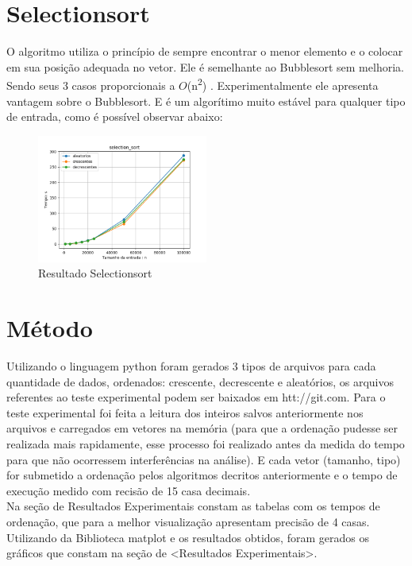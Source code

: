 \documentclass[10pt,a4paper]{article}
\begin{document}
\section{Selectionsort}
    \indent O algoritmo utiliza o princípio de sempre encontrar o menor elemento e o colocar em sua posição adequada no vetor. Ele é semelhante ao Bubblesort sem melhoria. Sendo seus 3 casos proporcionais a $O$(n\textsuperscript{2}) \cite{sunita}. Experimentalmente ele apresenta vantagem sobre o Bubblesort. E é um algorítimo muito estável para qualquer tipo de entrada, como é possível observar abaixo:
    \begin{figure}[H]
    	\centering
    	\includegraphics[width=0.5\textwidth]{Resultados/Graficos/selection_sort.png}
    	\caption{Resultado Selectionsort}
    \end{figure}

\newpage
\section{Método}
    \indent Utilizando o linguagem python foram gerados 3 tipos de arquivos para cada quantidade de dados, ordenados: crescente, decrescente e aleatórios, os arquivos referentes ao teste experimental podem ser baixados em htt://git.com. Para o teste experimental foi feita a leitura dos inteiros salvos anteriormente nos arquivos e carregados em vetores na memória (para que a ordenação pudesse ser realizada mais rapidamente, esse processo foi realizado antes da medida do tempo para que não ocorressem interferências na análise). E cada vetor (tamanho, tipo) for submetido a ordenação pelos algoritmos decritos anteriormente e o tempo de execução medido com recisão de 15 casa decimais.\\
    \indent Na seção de Resultados Experimentais constam as tabelas com os tempos de ordenação, que para a melhor visualização apresentam precisão de 4 casas. Utilizando da Biblioteca matplot e os resultados obtidos, foram gerados os gráficos que constam na seção de <Resultados Experimentais>.
\end{document}
